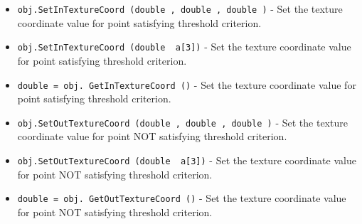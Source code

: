 \begin{itemize}
\item  \verb|obj.SetInTextureCoord (double , double , double )| -  Set the texture coordinate value for point satisfying threshold criterion.

\item  \verb|obj.SetInTextureCoord (double  a[3])| -  Set the texture coordinate value for point satisfying threshold criterion.

\item  \verb|double = obj. GetInTextureCoord ()| -  Set the texture coordinate value for point satisfying threshold criterion.

\item  \verb|obj.SetOutTextureCoord (double , double , double )| -  Set the texture coordinate value for point NOT satisfying threshold
  criterion.

\item  \verb|obj.SetOutTextureCoord (double  a[3])| -  Set the texture coordinate value for point NOT satisfying threshold
  criterion.

\item  \verb|double = obj. GetOutTextureCoord ()| -  Set the texture coordinate value for point NOT satisfying threshold
  criterion.

\end{itemize}
